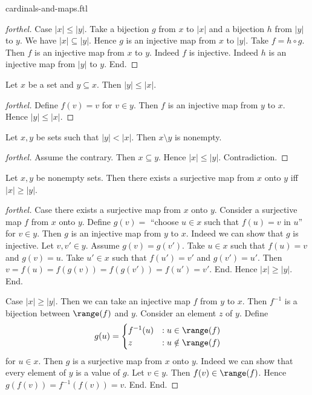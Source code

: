 \documentclass{naproche-library}
\begin{document}
\begin{smodule}{cardinals-and-maps.ftl}
\begin{proof}[forthel]
    Case $|x| \leq |y|$.
      Take a bijection $g$ from $x$ to $|x|$ and a bijection $h$ from $|y|$ to $y$.
      We have $|x| \subseteq |y|$.
      Hence $g$ is an injective map from $x$ to $|y|$.
      Take $f = h \circ g$.
      Then $f$ is an injective map from $x$ to $y$.
      Indeed $f$ is injective.
      Indeed $h$ is an injective map from $|y|$ to $y$.
    End.
  \end{proof}

  \begin{corollary}[forthel,id=SET_THEORY_06_4944303633727488]
    Let $x$ be a set and $y \subseteq x$.
    Then $|y| \leq |x|$.
  \end{corollary}
  \begin{proof}[forthel]
    Define $f(v) = v$ for $v \in y$.
    Then $f$ is an injective map from $y$ to $x$.
    Hence $|y| \leq |x|$.
  \end{proof}

  \begin{corollary}[forthel,id=SET_THEORY_06_7746592696172544]
    Let $x, y$ be sets such that $|y| < |x|$.
    Then $x \setminus y$ is nonempty.
  \end{corollary}
  \begin{proof}[forthel]
    Assume the contrary.
    Then $x \subseteq y$.
    Hence $|x| \leq |y|$.
    Contradiction.
  \end{proof}

  \begin{proposition}[forthel,id=SET_THEORY_06_192336220913664]
    Let $x, y$ be nonempty sets.
    Then there exists a surjective map from $x$ onto $y$ iff $|x| \geq |y|$.
  \end{proposition}
  \begin{proof}[forthel]
    Case there exists a surjective map from $x$ onto $y$.
      Consider a surjective map $f$ from $x$ onto $y$.
      Define $g(v) =$ ``choose $u \in x$ such that $f(u) = v$ in $u$'' for $v \in y$.
      Then $g$ is an injective map from $y$ to $x$.
      Indeed we can show that $g$ is injective.
        Let $v, v' \in y$.
        Assume $g(v) = g(v')$.
        Take $u \in x$ such that $f(u) = v$ and $g(v) = u$.
        Take $u' \in x$ such that $f(u') = v'$ and $g(v') = u'$.
        Then $v
          = f(u)
          = f(g(v))
          = f(g(v'))
          = f(u')
          = v'$.
      End.
      Hence $|x| \geq |y|$.
    End.

    Case $|x| \geq |y|$.
      Then we can take an injective map $f$ from $y$ to $x$.
      Then $f^{-1}$ is a bijection between $\range(f)$ and $y$.
      Consider an element $z$ of $y$.
      Define \[ g(u) =
        \begin{cases}
          f^{-1}(u) & : u \in \range(f) \\
          z         & : u \notin \range(f)
        \end{cases} \]
      for $u \in x$.
      Then $g$ is a surjective map from $x$ onto $y$.
      Indeed we can show that every element of $y$ is a value of $g$.
        Let $v \in y$.
        Then $f(v) \in \range(f)$.
        Hence $g(f(v)) = f^{-1}(f(v)) = v$.
      End.
    End.
  \end{proof}


\end{smodule}
\end{document}

